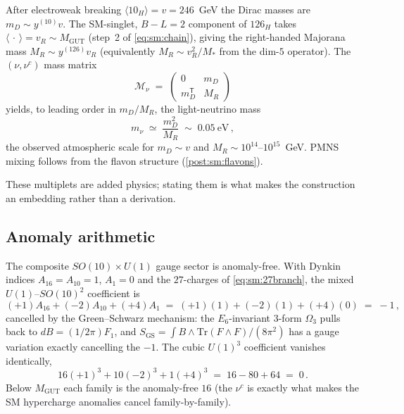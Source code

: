 \begin{theorem}\label{thm:sm:seesaw}
After electroweak breaking $\langle 10_H\rangle=v=246$~GeV the Dirac masses are
$m_D\sim y^{(10)}v$. The SM-singlet, $B\!-\!L=2$ component of $126_H$ takes
$\langle\,\cdot\,\rangle=v_R\sim M_{\mathrm{GUT}}$ (step~2 of \eqref{eq:sm:chain}),
giving the right-handed Majorana mass $M_R\sim y^{(126)}v_R$ (equivalently
$M_R\sim v_R^2/M_*$ from the dim-$5$ operator). The $(\nu,\nu^c)$ mass matrix
\begin{equation}\label{eq:sm:matrix}
\mathcal{M}_\nu \;=\;
\begin{pmatrix} 0 & m_D \\ m_D^{\mathsf T} & M_R \end{pmatrix}
\end{equation}
yields, to leading order in $m_D/M_R$, the light-neutrino mass
\begin{equation}\label{eq:sm:mnu}
m_\nu \;\simeq\; \frac{m_D^2}{M_R} \;\sim\; 0.05\ \mathrm{eV}\,,
\end{equation}
the observed atmospheric scale for $m_D\sim v$ and $M_R\sim 10^{14}$--$10^{15}$~GeV.
PMNS mixing follows from the flavon structure (\autoref{post:sm:flavons}).
\end{theorem}

These multiplets are added physics; stating them is what makes the construction an
embedding rather than a derivation.

\subsection{Anomaly arithmetic}
\label{sec:sm:anomaly}

\begin{theorem}\label{thm:sm:anomaly}
The composite $SO(10)\times U(1)$ gauge sector is anomaly-free. With Dynkin indices
$A_{16}=A_{10}=1$, $A_1=0$ and the $27$-charges of \eqref{eq:sm:27branch}, the mixed
$U(1)$--$SO(10)^2$ coefficient is
\begin{equation}\label{eq:sm:mixed}
(+1)A_{16}+(-2)A_{10}+(+4)A_1
 \;=\;(+1)(1)+(-2)(1)+(+4)(0)\;=\;-1\,,
\end{equation}
cancelled by the Green--Schwarz mechanism: the $E_6$-invariant $3$-form $\Omega_3$
pulls back to $dB=(1/2\pi)F_1$, and
$S_{\mathrm{GS}}=\int B\wedge \mathrm{Tr}(F\wedge F)/(8\pi^2)$ has a gauge variation
exactly cancelling the $-1$. The cubic $U(1)^3$ coefficient vanishes identically,
\begin{equation}\label{eq:sm:cubic}
16(+1)^3+10(-2)^3+1(+4)^3 \;=\; 16-80+64 \;=\; 0\,.
\end{equation}
Below $M_{\mathrm{GUT}}$ each family is the anomaly-free $16$ (the $\nu^c$ is exactly
what makes the SM hypercharge anomalies cancel family-by-family).
\end{theorem}

